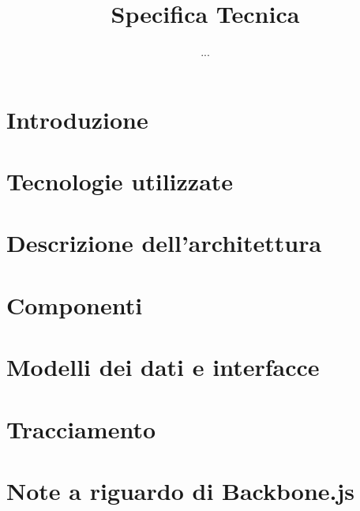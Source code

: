 


\author{...}
\dest{\ALL}
\title{Specifica Tecnica}


\maketitle

\tableofcontents
\listofpattern
\newpage



\section{Introduzione}


\section{Tecnologie utilizzate}


\section{Descrizione dell'architettura}


\section{Componenti}


\section{Modelli dei dati e interfacce}


\section{Tracciamento}




\appendix

\section{Note a riguardo di Backbone.js}



